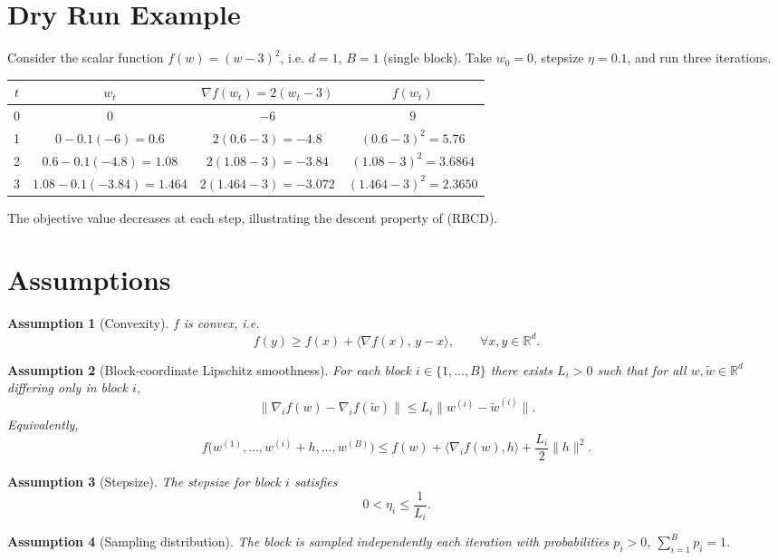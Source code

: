 \documentclass{article}
\newtheorem{assumption}{Assumption}
\newcommand{\R}{\mathbb{R}}
\begin{document}
\section*{Dry Run Example}
Consider the scalar function $f(w)=(w-3)^2$, i.e. $d=1$, $B=1$ (single block).
Take $w_0=0$, stepsize $\eta=0.1$, and run three iterations.

\begin{center}
\begin{tabular}{c|c|c|c}
$t$ & $w_t$ & $\nabla f(w_t)=2(w_t-3)$ & $f(w_t)$\\ \hline
0 & $0$ & $-6$ & $9$\\
1 & $0-0.1(-6)=0.6$ & $2(0.6-3)=-4.8$ & $(0.6-3)^2=5.76$\\
2 & $0.6-0.1(-4.8)=1.08$ & $2(1.08-3)=-3.84$ & $(1.08-3)^2=3.6864$\\
3 & $1.08-0.1(-3.84)=1.464$ & $2(1.464-3)=-3.072$ & $(1.464-3)^2=2.3650$\\
\end{tabular}
\end{center}
The objective value decreases at each step, illustrating the descent property of (RBCD).

\newpage

\section*{Assumptions}
\begin{assumption}[Convexity]\label{ass:convex}
$f$ is convex, i.e.
\[
f(y)\ge f(x)+\langle \nabla f(x),\,y-x\rangle,\qquad \forall x,y\in\R^{d}.
\]
\end{assumption}

\begin{assumption}[Block‑coordinate Lipschitz smoothness]\label{ass:smooth}
For each block $i\in\{1,\dots ,B\}$ there exists $L_i>0$ such that for all
$w,\tilde w\in\R^{d}$ differing only in block $i$,
\[
\|\nabla_i f(w)-\nabla_i f(\tilde w)\|\le L_i\|w^{(i)}-\tilde w^{(i)}\|.
\]
Equivalently,
\[
f\bigl(w^{(1)},\dots ,w^{(i)}+h,\dots ,w^{(B)}\bigr)
\le f(w)+\langle \nabla_i f(w),h\rangle+\frac{L_i}{2}\|h\|^{2}.
\tag{1}
\]
\end{assumption}

\begin{assumption}[Stepsize]\label{ass:stepsize}
The stepsize for block $i$ satisfies
\[
0<\eta_i\le \frac{1}{L_i}.
\]
\end{assumption}

\begin{assumption}[Sampling distribution]\label{ass:prob}
The block is sampled independently each iteration with probabilities
$p_i>0$, $\sum_{i=1}^{B}p_i=1$.
\end{assumption}
\end{document}

